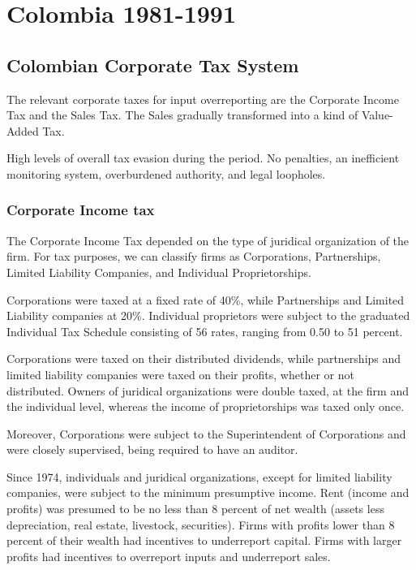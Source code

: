 \documentclass[
  12pt]{article}
\theoremstyle{definition}
\theoremstyle{remark}
\begin{document}
\section{Colombia 1981-1991}\label{colombia-1981-1991}

\subsection{Colombian Corporate Tax
System}\label{colombian-corporate-tax-system}

The relevant corporate taxes for input overreporting are the Corporate
Income Tax and the Sales Tax. The Sales gradually transformed into a
kind of Value-Added Tax.

High levels of overall tax evasion during the period. No penalties, an
inefficient monitoring system, overburdened authority, and legal
loopholes.

\subsubsection{Corporate Income tax}\label{corporate-income-tax}

The Corporate Income Tax depended on the type of juridical organization
of the firm. For tax purposes, we can classify firms as Corporations,
Partnerships, Limited Liability Companies, and Individual
Proprietorships.

Corporations were taxed at a fixed rate of 40\%, while Partnerships and
Limited Liability companies at 20\%. Individual proprietors were subject
to the graduated Individual Tax Schedule consisting of 56 rates, ranging
from 0.50 to 51 percent.

Corporations were taxed on their distributed dividends, while
partnerships and limited liability companies were taxed on their
profits, whether or not distributed. Owners of juridical organizations
were double taxed, at the firm and the individual level, whereas the
income of proprietorships was taxed only once.

Moreover, Corporations were subject to the Superintendent of
Corporations and were closely supervised, being required to have an
auditor.

Since 1974, individuals and juridical organizations, except for limited
liability companies, were subject to the minimum presumptive income.
Rent (income and profits) was presumed to be no less than 8 percent of
net wealth (assets less depreciation, real estate, livestock,
securities). Firms with profits lower than 8 percent of their wealth had
incentives to underreport capital. Firms with larger profits had
incentives to overreport inputs and underreport sales.
\end{document}
